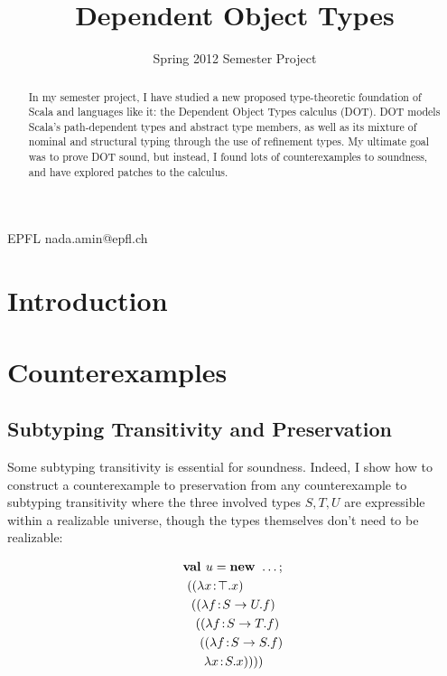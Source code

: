 \documentclass[preprint]{sigplanconf}
\begin{document}
\copyrightdata{[to be supplied]}


\title{Dependent Object Types}
\subtitle{Spring 2012 Semester Project}

           {EPFL}
           {nada.amin@epfl.ch}

\maketitle

\begin{abstract}
In my semester project, I have studied a new proposed type-theoretic
foundation of Scala and languages like it: the Dependent Object Types
calculus (DOT). DOT models Scala's path-dependent types and abstract
type members, as well as its mixture of nominal and structural typing
through the use of refinement types. My ultimate goal was to prove DOT
sound, but instead, I found lots of counterexamples to soundness, and
have explored patches to the calculus.
\end{abstract}


\section{Introduction}


\section{Counterexamples}

\subsection{Subtyping Transitivity and Preservation}\label{subpres}

Some subtyping transitivity is essential for soundness. Indeed, I show
how to construct a counterexample to preservation from any
counterexample to subtyping transitivity where the three involved
types $S, T, U$ are expressible within a realizable universe, though
the types themselves don't need to be realizable:

\begin{align*}
&\mlnew u \ldots {
\ \mlapp{\abs x \Top x}{
\ \ \mlapp{\abs f {S \tfun U} f}{
\ \ \ \mlapp{\abs f {S \tfun T} f}{
\ \ \ \ \mlapp{\abs f {S \tfun S} f}{
\ \ \  \ \ \abs x S x}}}}}
\end{align*}
\end{document}
